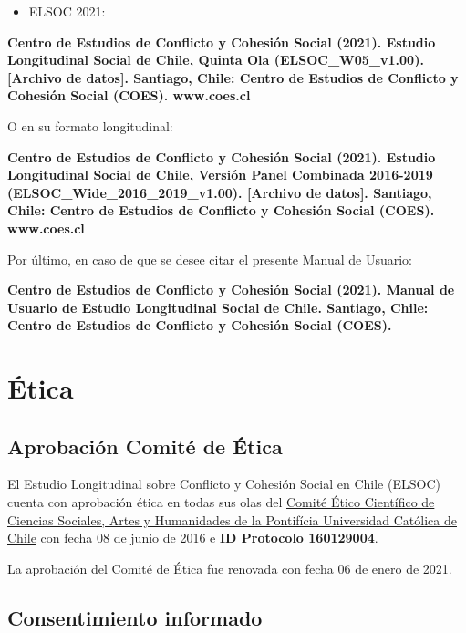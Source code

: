 \documentclass[
  12pt,
]{article}
\providecommand{\tightlist}{%
  \setlength{\itemsep}{0pt}\setlength{\parskip}{0pt}}
\begin{document}
\begin{itemize}
\tightlist
\item
  ELSOC 2021:
\end{itemize}

\textbf{Centro de Estudios de Conflicto y Cohesión Social (2021). Estudio Longitudinal Social de Chile, Quinta Ola (ELSOC\_W05\_v1.00). {[}Archivo de datos{]}. Santiago, Chile: Centro de Estudios de Conflicto y Cohesión Social (COES). www.coes.cl}

O en su formato longitudinal:

\textbf{Centro de Estudios de Conflicto y Cohesión Social (2021). Estudio Longitudinal Social de Chile, Versión Panel Combinada 2016-2019 (ELSOC\_Wide\_2016\_2019\_v1.00). {[}Archivo de datos{]}. Santiago, Chile: Centro de Estudios de Conflicto y Cohesión Social (COES). www.coes.cl}

Por último, en caso de que se desee citar el presente Manual de Usuario:

\textbf{Centro de Estudios de Conflicto y Cohesión Social (2021). Manual de Usuario de Estudio Longitudinal Social de Chile. Santiago, Chile: Centro de Estudios de Conflicto y Cohesión Social (COES).}

\newpage

\hypertarget{uxe9tica}{%
\section{Ética}\label{uxe9tica}}

\hypertarget{aprobaciuxf3n-comituxe9-de-uxe9tica}{%
\subsection{Aprobación Comité de Ética}\label{aprobaciuxf3n-comituxe9-de-uxe9tica}}

El Estudio Longitudinal sobre Conflicto y Cohesión Social en Chile (ELSOC) cuenta con aprobación ética en todas sus olas del \href{http://eticayseguridad.uc.cl/comite-etico-cientifico-en-ciencias-sociales-artes-y-humanidades.html}{Comité Ético Científico de Ciencias Sociales, Artes y Humanidades de la Pontifícia Universidad Católica de Chile} con fecha 08 de junio de 2016 e \textbf{ID Protocolo 160129004}.

La aprobación del Comité de Ética fue renovada con fecha 06 de enero de 2021.

\hypertarget{consentimiento-informado}{%
\subsection{Consentimiento informado}\label{consentimiento-informado}}
\end{document}
